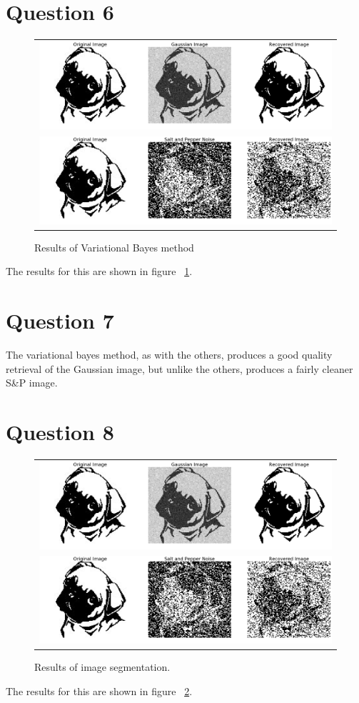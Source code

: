\documentclass[]{article}
\begin{document}
    \section*{Question 6}
        \begin{figure}[h]
            \centering
            \begin{tabular}{c}
                \includegraphics[width=0.5\linewidth]{output_10_0.png}\\
                \includegraphics[width=0.5\linewidth]{output_10_1.png}
            \end{tabular}
            \caption{Results of Variational Bayes method}
            \label{fig:q6}
        \end{figure}
        \par The results for this are shown in figure ~\ref{fig:q6}.

    \section*{Question 7}
        \par The variational bayes method, as with the others, produces a good quality retrieval of the Gaussian image, but unlike the others, produces a fairly cleaner S\&P image.
    \section*{Question 8}
    \begin{figure}[h]
        \centering
        \begin{tabular}{c}
            \includegraphics[width=0.5\linewidth]{output_10_0.png}\\
            \includegraphics[width=0.5\linewidth]{output_10_1.png}
        \end{tabular}
        \caption{Results of image segmentation.}
        \label{fig:q8}
    \end{figure}
    \par The results for this are shown in figure ~\ref{fig:q8}.
\end{document}
